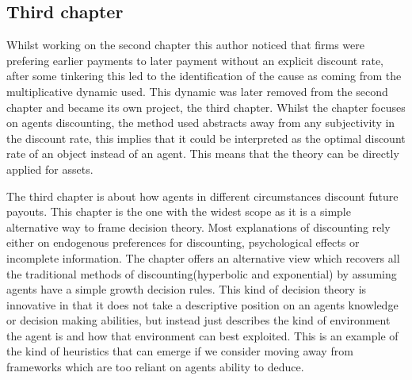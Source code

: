 \documentclass[12pt]{article}
\numberwithin{equation}{section}
\begin{document}
 \subsection{Third chapter}

Whilst working on the second chapter this author noticed that firms were prefering earlier payments to later payment without an explicit discount rate, after some tinkering this led to the identification of the cause as coming from the multiplicative dynamic used. This dynamic was later removed from the second chapter and became its own project, the third chapter. Whilst the chapter focuses on agents discounting, the method used abstracts away from any subjectivity in the discount rate, this implies that it could be interpreted as the optimal discount rate of an object instead of an agent. This means that the theory can be directly applied for assets.  

The third chapter is about how agents in different circumstances discount future payouts. This chapter is the one with the widest scope as it is a simple alternative way to frame decision theory. Most explanations of discounting rely either on endogenous preferences for discounting, psychological effects or incomplete information. The chapter offers an alternative view which recovers all the traditional methods of discounting(hyperbolic and exponential) by assuming agents have a simple growth decision rules. This kind of decision theory is innovative in that it does not take a descriptive position on an agents knowledge or decision making abilities, but instead just describes the kind of environment the agent is and how that environment can best exploited. This is an example of the kind of heuristics that can emerge if we consider moving away from frameworks which are too reliant on agents ability to deduce.





\end{document}
